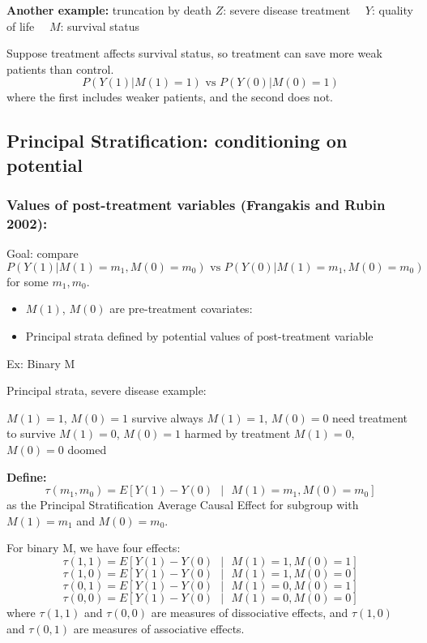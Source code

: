 \textbf{Another example:} truncation by death \newline
    \quad \( Z \): severe disease treatment \newline
    \( \quad Y \): quality of life \newline
    \( \quad M \): survival status \newline
    
Suppose treatment affects survival status, so treatment can save more weak patients than control. 
\[P(Y(1)|M(1)=1) \text{ vs } P(Y(0)|M(0)=1)\]
where the first includes weaker patients, and the second does not.

\subsection{Principal Stratification: conditioning on potential}

\subsubsection{Values of post-treatment variables (Frangakis and Rubin 2002):}

Goal: compare 
\(P(Y(1)|M(1)=m_1, M(0) = m_0) \text{ vs } P(Y(0)|M(1)=m_1, M(0) = m_0)\) for some \(m_1, m_0\).

\begin{itemize}
    \item \(M(1)\), \(M(0)\) are pre-treatment covariates:
    \item Principal strata defined by potential values of post-treatment variable

\end{itemize}

Ex: Binary M

Principal strata, severe disease example:

\(M(1)=1\), \(M(0)=1\) survive always \newline
\(M(1)=1\), \(M(0)=0\) need treatment to survive \newline
\(M(1)=0\), \(M(0)=1\) harmed by treatment \newline
\(M(1)=0\), \(M(0)=0\) doomed \newline

\textbf{Define:}
\[\tau(m_1, m_0) = E[Y(1) - Y(0) \text{ }| \text{ } M(1) = m_1, M(0) = m_0]\] as the Principal Stratification Average Causal Effect for subgroup with \(M(1) = m_1\) and \(M(0) = m_0\).

For binary M, we have four effects:
\[\tau(1, 1) = E[Y(1) - Y(0) \text{ }| \text{ } M(1) = 1, M(0) = 1]\]
\[\tau(1, 0) = E[Y(1) - Y(0) \text{ }| \text{ } M(1) = 1, M(0) = 0]\]
\[\tau(0, 1) = E[Y(1) - Y(0) \text{ }| \text{ } M(1) = 0, M(0) = 1]\]
\[\tau(0, 0) = E[Y(1) - Y(0) \text{ }| \text{ } M(1) = 0, M(0) = 0]\]
where \(\tau(1, 1)\) and \(\tau(0,0)\) are measures of dissociative effects, and \(\tau(1, 0)\) and \(\tau(0,1)\) are measures of associative effects.


